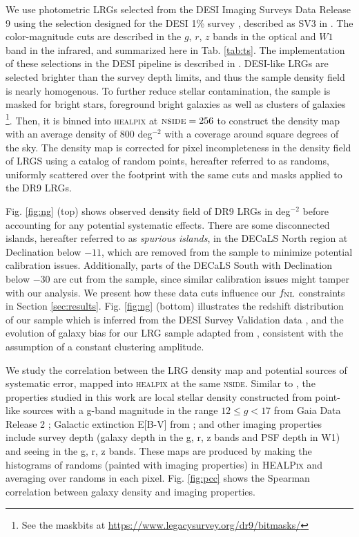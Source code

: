 We use photometric LRGs selected from the DESI Imaging Surveys Data Release 9 \citep[DR9;][]{dey2018overview} using the selection designed for the DESI 1\% survey , described as SV3 in \cite{zhou2022target}. The color-magnitude cuts are described in the $g$, $r$, $z$ bands in the optical and $W1$ band in the infrared, and summarized here in Tab. \ref{tab:ts}. The implementation of these selections in the DESI pipeline is described in . DESI-like LRGs are selected brighter than the survey depth limits, and thus the sample density field is nearly homogenous. To further reduce stellar contamination, the sample is masked for bright stars, foreground bright galaxies as well as clusters of galaxies \footnote{See the maskbits at \url{https://www.legacysurvey.org/dr9/bitmasks/}}. Then, it is binned into \textsc{healpix} \citep{gorski2005healpix} at $\textsc{nside}=256$ to construct the density map with an average density of $800$ deg$^{-2}$ with a coverage around  square degrees of the sky. The density map is corrected for pixel incompleteness in the density field of LRGS using a catalog of random points, hereafter referred to as randoms, uniformly scattered over the footprint with the same cuts and masks applied to the DR9 LRGs. 

Fig. \ref{fig:ng} (top) shows observed density field of DR9 LRGs in deg$^{-2}$ before accounting for any potential systematic effects. There are some disconnected islands, hereafter referred to as \textit{spurious islands}, in the DECaLS North region at Declination below $-11$, which are removed from the sample to minimize potential calibration issues. Additionally, parts of the DECaLS South with Declination below $-30$ are cut from the sample, since similar calibration issues might tamper with our analysis. We present  how these data cuts influence our $f_{\rm NL}$ constraints in Section \ref{sec:results}. Fig. \ref{fig:ng} (bottom) illustrates the redshift distribution of our sample which is inferred from the DESI Survey Validation data , and the evolution of  galaxy bias for our LRG sample adapted from \cite{zhou2021clustering}, consistent with the assumption of a constant clustering amplitude.

We study the correlation between the LRG density map and potential sources of systematic error, mapped into \textsc{healpix} at the same \textsc{nside}. Similar to \cite{zhou2022target}, the properties studied in this work are local stellar density constructed from point-like sources with a g-band magnitude in the range $12 \leq g < 17$ from Gaia Data Release 2 \citep[see,][]{gaiadr2, myers2022};  Galactic extinction E[B-V] from \cite{schlegel1998maps}; and other imaging properties include survey depth (galaxy depth in the g, r, z bands and PSF depth in W1) and seeing in the g, r, z bands. These maps are produced by making the histograms of randoms (painted with imaging properties) in \textsc{HEALPix} and averaging over randoms in each pixel. Fig. \ref{fig:pcc} shows the Spearman correlation between galaxy density and imaging properties.


